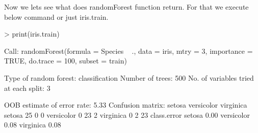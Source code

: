 \documentclass[journal]{IEEEtran}
\begin{document}
Now we lets see what does randomForest function return. For that we execute below command or just iris.train.
\begin{Schunk}
\begin{Sinput}
> print(iris.train)
\end{Sinput}
\begin{Soutput}
Call:
 randomForest(formula = Species ~ ., 
data = iris, mtry = 3, importance = TRUE, 
do.trace = 100, subset = train) 

Type of random forest: classification
Number of trees: 500
No. of variables tried at each split: 3

OOB estimate of  error rate: 5.33%
Confusion matrix:
           setosa versicolor virginica 
setosa         25          0         0        
versicolor      0         23         2        
virginica       0          2        23        
		class.error
setosa         0.00
versicolor     0.08
virginica      0.08
\end{Soutput}
\end{Schunk}
\end{document}
